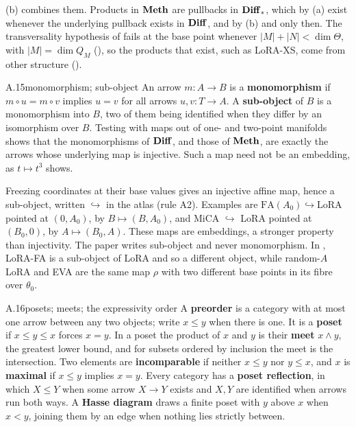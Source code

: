 \medskip\noindent
{}(b) combines them. Products in $\mathbf{Meth}$ are pullbacks in $\mathbf{Diff}_*$, which by (a) exist whenever
the underlying pullback exists in $\mathbf{Diff}$, and by (b) and  only then. The transversality hypothesis of
 fails at the base point whenever $\lvert M\rvert+\lvert N\rvert<\dim\Theta$, with $\lvert M\rvert=\dim Q_M$
(), so the products that exist, such as LoRA-XS, come from other structure ().


\begin{bgentry}{A.15}{monomorphism; sub-object}
An arrow $m:A\to B$ is a \textbf{monomorphism} if $m\circ u=m\circ v$ implies $u=v$ for all arrows $u,v:T\to A$. A
\textbf{sub-object} of $B$ is a monomorphism into $B$, two of them being identified when they differ by an isomorphism
over $B$. Testing with maps out of one- and two-point manifolds shows that the monomorphisms of $\mathbf{Diff}$, and those of
$\mathbf{Meth}$, are exactly the arrows whose underlying map is injective. Such a map need not be an embedding, as
$t\mapsto t^3$ shows.
\end{bgentry}

Freezing coordinates at their base values gives an injective affine map, hence a sub-object, written $\hookrightarrow$ in
the atlas (rule A2). Examples are $\mathrm{FA}(A_0)\hookrightarrow\mathrm{LoRA}$ pointed at $(0,A_0)$, by
$B\mapsto(B,A_0)$, and MiCA \citep{rudiger2026mica} ${}\hookrightarrow{}$ LoRA pointed at $(B_0,0)$, by
$A\mapsto(B_0,A)$. These maps are embeddings, a stronger property than injectivity. The paper writes sub-object and never
monomorphism. In , LoRA-FA is a sub-object of LoRA and so a different object, while random-$A$
LoRA and EVA \citep{paischer2024parameter} are the same map $\rho$ with two different base points in its fibre over
$\theta_0$.


\begin{bgentry}{A.16}{posets; meets; the expressivity order}
A \textbf{preorder} is a category with at most one arrow between any two objects; write $x\le y$ when there is one. It
is a \textbf{poset} if $x\le y\le x$ forces $x=y$. In a poset the product of $x$ and $y$ is their \textbf{meet}
$x\wedge y$, the greatest lower bound, and for subsets ordered by inclusion the meet is the intersection. Two elements are
\textbf{incomparable} if neither $x\le y$ nor $y\le x$, and $x$ is \textbf{maximal} if $x\le y$ implies $x=y$. Every
category has a \textbf{poset reflection}, in which $X\le Y$ when some arrow $X\to Y$ exists and $X,Y$ are identified when
arrows run both ways. A \textbf{Hasse diagram} draws a finite poset with $y$ above $x$ when $x<y$, joining them by an
edge when nothing lies strictly between.
\end{bgentry}

